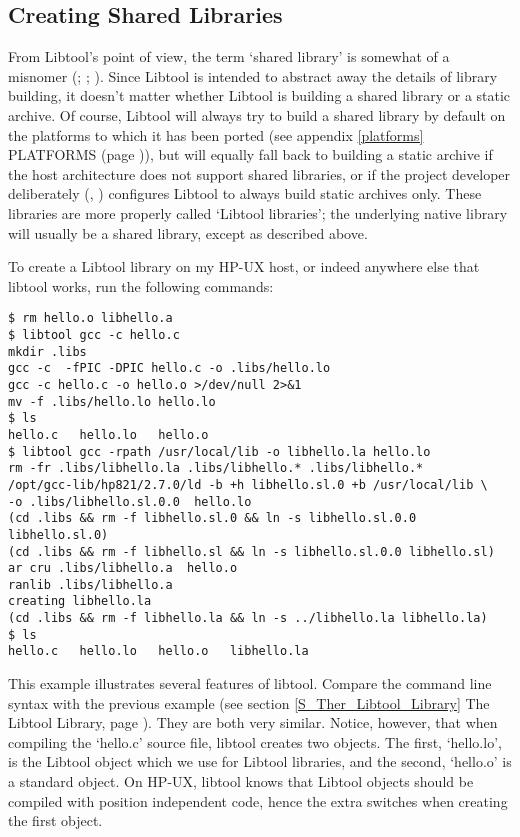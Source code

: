 \subsection{Creating Shared Libraries}

From Libtool's point of view, the term `shared library' is somewhat of a 
misnomer ({\MiQ{}}; {\MaQ{}}; {\MeQ{}}). Since Libtool is intended to abstract away 
the details of library building, it doesn't matter whether Libtool 
is building a shared library or a static archive. Of course, Libtool will 
always try to build a shared library by default on the platforms to which it 
has been ported (see appendix \ref{platforms} PLATFORMS
(page \pageref{platforms})), but will equally fall back to building a static 
archive if the host architecture does not support shared libraries, or if the 
project developer deliberately ({\MbQ{}}, {\MiQ{}}) configures Libtool to always 
build static archives only. These libraries are more properly 
called `Libtool libraries'; the underlying native library will usually be a 
shared library, except as described above. 


To create a Libtool library on my HP-UX host, or indeed anywhere else that libtool works, run the following commands: 

\begin{Verbatim}
$ rm hello.o libhello.a
$ libtool gcc -c hello.c
mkdir .libs
gcc -c  -fPIC -DPIC hello.c -o .libs/hello.lo
gcc -c hello.c -o hello.o >/dev/null 2>&1
mv -f .libs/hello.lo hello.lo
$ ls
hello.c   hello.lo   hello.o
$ libtool gcc -rpath /usr/local/lib -o libhello.la hello.lo
rm -fr .libs/libhello.la .libs/libhello.* .libs/libhello.*
/opt/gcc-lib/hp821/2.7.0/ld -b +h libhello.sl.0 +b /usr/local/lib \
-o .libs/libhello.sl.0.0  hello.lo
(cd .libs && rm -f libhello.sl.0 && ln -s libhello.sl.0.0 libhello.sl.0)
(cd .libs && rm -f libhello.sl && ln -s libhello.sl.0.0 libhello.sl)
ar cru .libs/libhello.a  hello.o
ranlib .libs/libhello.a
creating libhello.la
(cd .libs && rm -f libhello.la && ln -s ../libhello.la libhello.la)
$ ls
hello.c   hello.lo   hello.o   libhello.la
\end{Verbatim}

This example illustrates several features of libtool. Compare the command line
syntax with the previous example (see section \ref{S_Ther_Libtool_Library}
The Libtool Library, page \pageref{S_Ther_Libtool_Library}). They are both
very similar. Notice, however, that when compiling the `hello.c' source file, libtool creates two objects. The first, `hello.lo', is the Libtool object which we use for Libtool libraries, and the second, `hello.o' is a standard object. On HP-UX, libtool knows that Libtool objects should be compiled with position independent code, hence the extra switches when creating the first object. 

